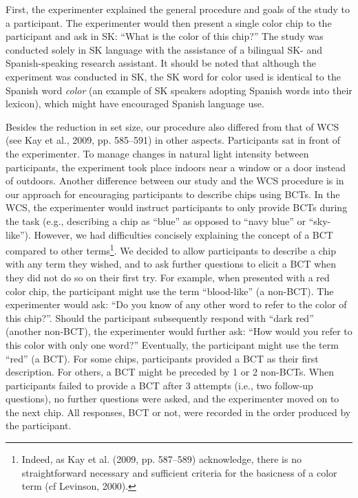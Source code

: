 \documentclass[
  english,
  ,man,floatsintext]{apa6}
\begin{document}
First, the experimenter explained the general procedure and goals of the study to a participant. The experimenter would then present a single color chip to the participant and ask in SK: \enquote{What is the color of this chip?} The study was conducted solely in SK language with the assistance of a bilingual SK- and Spanish-speaking research assistant. It should be noted that although the experiment was conducted in SK, the SK word for color used is identical to the Spanish word \emph{color} (an example of SK speakers adopting Spanish words into their lexicon), which might have encouraged Spanish language use.

Besides the reduction in set size, our procedure also differed from that of WCS (see Kay et al., 2009, pp. 585--591) in other aspects. Participants sat in front of the experimenter. To manage changes in natural light intensity between participants, the experiment took place indoors near a window or a door instead of outdoors. Another difference between our study and the WCS procedure is in our approach for encouraging participants to describe chips using BCTs. In the WCS, the experimenter would instruct participants to only provide BCTs during the task (e.g., describing a chip as \enquote{blue} as opposed to \enquote{navy blue} or \enquote{sky-like}). However, we had difficulties concisely explaining the concept of a BCT compared to other terms\footnote{Indeed, as Kay et al. (2009, pp. 587--589) acknowledge, there is no straightforward necessary and sufficient criteria for the basicness of a color term (cf Levinson, 2000).}. We decided to allow participants to describe a chip with any term they wished, and to ask further questions to elicit a BCT when they did not do so on their first try. For example, when presented with a red color chip, the participant might use the term \enquote{blood-like} (a non-BCT). The experimenter would ask: \enquote{Do you know of any other word to refer to the color of this chip?}. Should the participant subsequently respond with \enquote{dark red} (another non-BCT), the experimenter would further ask: \enquote{How would you refer to this color with only one word?} Eventually, the participant might use the term \enquote{red} (a BCT). For some chips, participants provided a BCT as their first description. For others, a BCT might be preceded by 1 or 2 non-BCTs. When participants failed to provide a BCT after 3 attempts (i.e., two follow-up questions), no further questions were asked, and the experimenter moved on to the next chip. All responses, BCT or not, were recorded in the order produced by the participant.
\end{document}

